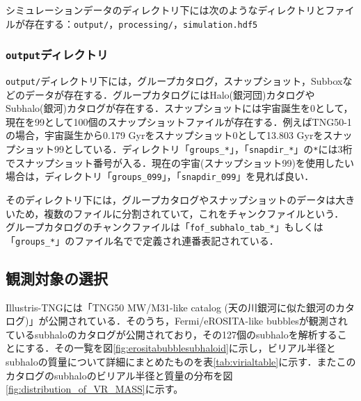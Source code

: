
シミュレーションデータのディレクトリ下には次のようなディレクトリとファイルが存在する：\texttt{output/}，\texttt{processing/}，\texttt{simulation.hdf5}

\subsubsection{\texttt{output}ディレクトリ}

\texttt{output/}ディレクトリ下には，グループカタログ，スナップショット，Subboxなどのデータが存在する．グループカタログにはHalo(銀河団)カタログやSubhalo(銀河)カタログが存在する．スナップショットには宇宙誕生を0として，現在を99として100個のスナップショットファイルが存在する．例えばTNG50-1の場合，宇宙誕生から0.179 Gyrをスナップショット0として13.803 Gyrをスナップショット99としている．ディレクトリ「\texttt{groups\_*}」，「\texttt{snapdir\_*}」の\texttt{*}には3桁でスナップショット番号が入る．現在の宇宙(スナップショット99)を使用したい場合は，ディレクトリ「\texttt{groups\_099}」，「\texttt{snapdir\_099}」を見れば良い．

そのディレクトリ下には，グループカタログやスナップショットのデータは大きいため，複数のファイルに分割されていて，これをチャンクファイルという． グループカタログのチャンクファイルは「\texttt{fof\_subhalo\_tab\_*}」もしくは「\texttt{groups\_*}」のファイル名でで定義され連番表記されている．

\subsection{観測対象の選択}

Illustris-TNGには「TNG50 MW/M31-like catalog (天の川銀河に似た銀河のカタログ)」が公開されている\citep{pillepich_milky_2023}．そのうち，Fermi/eROSITA-like bubblesが観測されているsubhaloのカタログが公開されており\citep{pillepich_x-ray_2021}，その127個のsubhaloを解析することにする．その一覧を図\ref{fig:erositabubblesubhaloid}に示し，ビリアル半径とsubhaloの質量について詳細にまとめたものを表\ref{tab:virialtable}に示す．またこのカタログのsubhaloのビリアル半径と質量の分布を図\ref{fig:distribution_of_VR_MASS}に示す。

